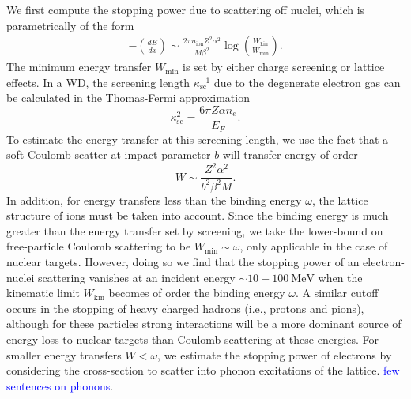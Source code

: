 \documentclass[twocolumn,showpacs,preprintnumbers,amsmath,amssymb,prd]{revtex4}
\newcommand{\MeV}{\text{MeV}}
\def\r{\right)}
\def\l{\left(}
\begin{document}
\begin{appendices}
We first compute the stopping power due to scattering off nuclei, which is parametrically of the form
\begin{align}
\label{eq:SP}
  - \l \frac{dE}{dx}\r \sim \frac{2 \pi n_\text{ion} Z^2 \alpha^2}{M \beta^2} 
    \log {\l\frac{W_\text{kin}}{W_\text{min}}\r}.
\end{align}
The minimum energy transfer $W_\text{min}$ is set by either charge screening or lattice effects.  
In a WD, the screening length $\kappa_{\text{sc}}^{-1}$ due to the degenerate electron gas can be calculated in the Thomas-Fermi approximation \cite{Teukolsky}
\begin{equation}
\label{eq:TF}
\kappa_{\text{sc}}^{2} = \frac{6 \pi Z \alpha n_e}{E_F}.
\end{equation}
To estimate the energy transfer at this screening length, we use the fact that a soft Coulomb scatter at impact parameter $b$ will transfer energy of order
\begin{equation}
\label{eq:impact}
  W \sim \frac{Z^2 \alpha^2}{b^2 \beta^2 M}.
\end{equation}
In addition, for energy transfers less than the binding energy $\omega$, the lattice structure of ions must be taken into account. 
Since the binding energy is much greater than the energy transfer set by screening, we take the lower-bound on free-particle Coulomb scattering to be $W_\text{min} \sim \omega$, only applicable in the case of nuclear targets.
However, doing so we find that the stopping power of an electron-nuclei scattering vanishes at an incident energy $\sim 10 - 100 ~\MeV$ when the kinematic limit $W_\text{kin}$ becomes of order the binding energy $\omega$.
A similar cutoff occurs in the stopping of heavy charged hadrons (i.e., protons and pions), although for these particles strong interactions will be a more dominant source of energy loss to nuclear targets than Coulomb scattering at these energies. 
For smaller energy transfers $W < \omega$, we estimate the stopping power of electrons by considering the cross-section to scatter into phonon excitations of the lattice. 
\textcolor{blue}{few sentences on phonons}. 


\end{appendices}
\end{document}
